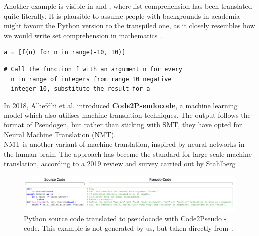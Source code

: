 Another example is visible in  and , where list comprehension has been translated quite literally. It is plausible to assume people with backgrounds in academia might favour the Python version to the transpiled one, as it closely resembles how we would write set comprehension in mathematics~\cite[11]{setComprehension}. \\

\begin{lstlisting}[caption={A list comprehension of applying f(n) to integers in the range -10 to 10, and placing the results in a list.}, captionpos=b, label={listComprehensionPython}]
a = [f(n) for n in range(-10, 10)]
\end{lstlisting}

\begin{lstlisting}[caption={Pseudocode version of \Cref{listComprehensionPython} generated with Pseudogen. This example is not generated by us, but copied from a video on their website.}, captionpos=b, label={listComprehensionPseudogen}]
# Call the function f with an argument n for every
  n in range of integers from range 10 negative
  integer 10, substitute the result for a
\end{lstlisting}

In 2018, Alhefdhi et al. introduced \textbf{Code2Pseudocode}, a machine learning model which also utilises machine translation techniques. The output follows the format of Pseudogen, but rather than sticking with SMT, they have opted for Neural Machine Translation (NMT). \\

NMT is another variant of machine translation, inspired by neural networks in the human brain. The approach has become the standard for large-scale machine translation, according to a 2019 review and survey carried out by Stahlberg~\cite{nmtOverSmt}. \\

\begin{figure}[ht]
    \centering
    \includegraphics[scale=.37]{assets/chapter3/Code2Pseudocode.png}
    \caption{Python source code translated to pseudocode with Code2Pseudo -code. This example is not generated by us, but taken directly from~\cite{code2pseudocode}.}
    \label{code2Pseudocode}
\end{figure}

